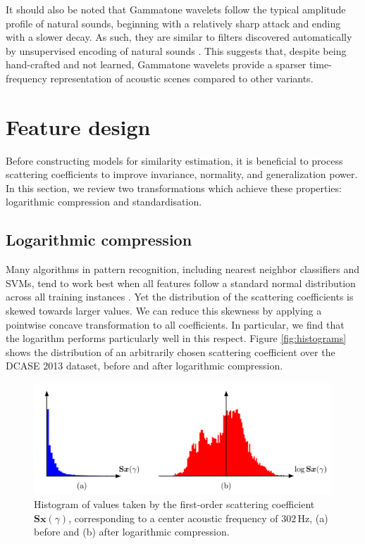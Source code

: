 \documentclass[smallextended]{svjour3}
\begin{document}
It should also be noted that Gammatone wavelets follow the typical amplitude profile of natural sounds, beginning with a relatively sharp attack and ending with a slower decay.
As such, they are similar to filters discovered automatically by unsupervised encoding of natural sounds \cite{Smith2006}.
This suggests that, despite being hand-crafted and not learned, Gammatone wavelets provide a sparser time-frequency representation of acoustic scenes compared to other variants.

\section{Feature design}
\label{sec:design}

Before constructing models for similarity estimation, it is beneficial to process scattering coefficients to improve invariance, normality, and generalization power.
In this section, we review two transformations which achieve these properties: logarithmic compression and standardisation.

\subsection{Logarithmic compression}
\label{sec:logcomp}

Many algorithms in pattern recognition, including nearest neighbor classifiers and SVMs, tend to work best when all features follow a standard normal distribution across all training instances \cite{Hsu2003}.
Yet the distribution of the scattering coefficients is skewed towards larger values. We can reduce this skewness by applying a pointwise concave transformation to all coefficients. In particular, we find that the logarithm performs particularly well in this respect.
Figure \ref{fig:histograms} shows the distribution of an arbitrarily chosen scattering coefficient over the DCASE 2013 dataset, before and after logarithmic compression.

\begin{figure}
\begin{center}
\includegraphics[width=\columnwidth]{figures/compression}
\caption{
\label{fig:histograms}
Histogram of values taken by the first-order scattering coefficient $\mathbf{S}\boldsymbol{x}(\gamma)$, corresponding to a center acoustic frequency of $302\,\mathrm{Hz}$,
(a) before and (b) after logarithmic compression.}
\label{fig:compression}
\end{center}
\end{figure}
\end{document}
